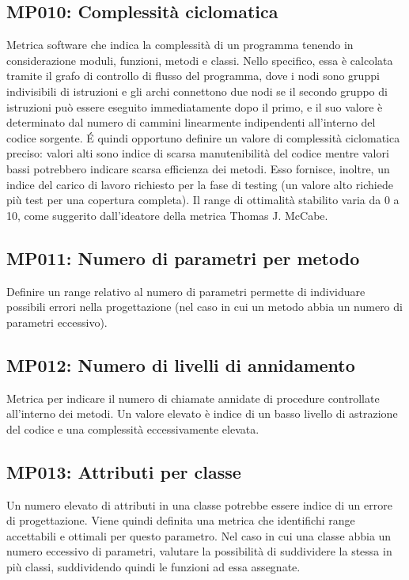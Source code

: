 \subsection{MP010: Complessità ciclomatica}
Metrica software che indica la complessità di un programma tenendo in considerazione moduli, funzioni, metodi e classi.
Nello specifico, essa è calcolata tramite il grafo di controllo di flusso del programma, dove i nodi sono gruppi indivisibili di istruzioni e gli archi connettono due nodi se il secondo gruppo di istruzioni può essere eseguito immediatamente dopo il primo, e il suo valore è determinato dal numero di cammini linearmente indipendenti all'interno del codice sorgente. 
\'E quindi opportuno definire un valore di complessità ciclomatica preciso: valori alti sono indice di scarsa manutenibilità del codice mentre valori bassi potrebbero indicare scarsa efficienza dei metodi.
Esso fornisce, inoltre, un indice del carico di lavoro richiesto per la fase di testing (un valore alto richiede più test per una copertura completa).
Il range di ottimalità stabilito varia da 0 a 10, come suggerito dall'ideatore della metrica Thomas J. McCabe.  

\subsection{MP011: Numero di parametri per metodo}
Definire un range relativo al numero di parametri permette di individuare possibili errori nella progettazione (nel caso in cui un metodo abbia un numero di parametri eccessivo).

\subsection{MP012: Numero di livelli di annidamento}
Metrica per indicare il numero di chiamate annidate di procedure controllate all'interno dei metodi.\newline
Un valore elevato è indice di un basso livello di astrazione del codice e una complessità eccessivamente elevata. 

\subsection{MP013: Attributi per classe}
Un numero elevato di attributi in una classe potrebbe essere indice di un errore di progettazione.
Viene quindi definita una metrica che identifichi range accettabili e ottimali per questo parametro.
Nel caso in cui una classe abbia un numero eccessivo di parametri, valutare la possibilità di suddividere la stessa in più classi, suddividendo quindi le funzioni ad essa assegnate.

